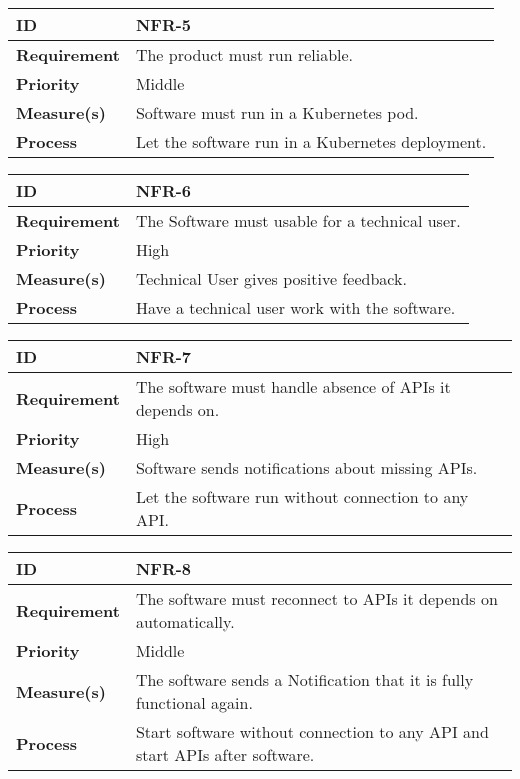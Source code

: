 \begin{center}
\begin{tabular}{ | m{8em} | m{25em}| } 
 \hline
 \textbf{ID} & NFR-5\\ 
 \hline
 \textbf{Requirement} & The product must run reliable.\\
 \hline
 \textbf{Priority} & Middle\\
 \hline
 \textbf{Measure(s)} & Software must run in a Kubernetes pod.\\
 \hline
 \textbf{Process} & Let the software run in a Kubernetes deployment.\\
 \hline
\end{tabular}
\end{center}

\begin{center}
\begin{tabular}{ | m{8em} | m{25em}| } 
 \hline
 \textbf{ID} & NFR-6\\ 
 \hline
 \textbf{Requirement} & The Software must usable for a technical user.\\
 \hline
 \textbf{Priority} & High \\
 \hline
 \textbf{Measure(s)} & Technical User gives positive feedback.\\
 \hline
 \textbf{Process} & Have a technical user work with the software.\\
 \hline
\end{tabular}
\end{center}

\begin{center}
\begin{tabular}{ | m{8em} | m{25em}| } 
 \hline
 \textbf{ID} & NFR-7\\ 
 \hline
 \textbf{Requirement} & The software must handle absence of APIs it depends on.\\
 \hline
 \textbf{Priority} & High \\
 \hline
 \textbf{Measure(s)} & Software sends notifications about missing APIs.\\
 \hline
 \textbf{Process} & Let the software run without connection to any API.\\
 \hline
\end{tabular}
\end{center}

\begin{center}
\begin{tabular}{ | m{8em} | m{25em}| } 
 \hline
 \textbf{ID} & NFR-8\\ 
 \hline
 \textbf{Requirement} & The software must reconnect to APIs it depends on automatically.\\
 \hline
 \textbf{Priority} & Middle \\
 \hline
 \textbf{Measure(s)} & The software sends a Notification that it is fully functional again.\\
 \hline
 \textbf{Process} & Start software without connection to any API and start APIs after software.\\
 \hline
\end{tabular}
\end{center}

